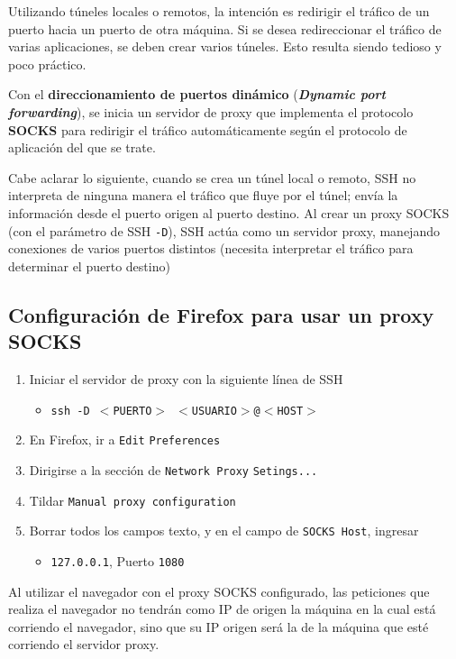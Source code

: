 Utilizando túneles locales o remotos, la intención es redirigir el tráfico de un puerto hacia un puerto de otra máquina. Si se desea redireccionar el tráfico de varias aplicaciones, se deben crear varios túneles. Esto resulta siendo tedioso y poco práctico.

Con el \textbf{direccionamiento de puertos dinámico} (\emph{\textbf{Dynamic port forwarding}}), se inicia un servidor de proxy que implementa el protocolo \textbf{SOCKS} para redirigir el tráfico automáticamente según el protocolo de aplicación del que se trate. 

Cabe aclarar lo siguiente, cuando se crea un túnel local o remoto, SSH no interpreta de ninguna manera el tráfico que fluye por el túnel; envía la información desde el puerto origen al puerto destino. Al crear un proxy SOCKS (con el parámetro de SSH \texttt{-D}), SSH actúa como un servidor proxy, manejando conexiones de varios puertos distintos (necesita interpretar el tráfico para determinar el puerto destino) \autocite{SODynamicPortForwarding}

\subsection{Configuración de Firefox para usar un proxy SOCKS}

\begin{enumerate}
    \item Iniciar el servidor de proxy con la siguiente línea de SSH
    \begin{itemize}
        \item \texttt{ssh -D $<$PUERTO$>$ $<$USUARIO$>$@$<$HOST$>$} 
    \end{itemize}
    \item En Firefox, ir a \texttt{Edit} \textrightarrow \texttt{Preferences}  
    \item Dirigirse a la sección de \texttt{Network Proxy} \textrightarrow \texttt{Setings...} 
    \item Tildar \texttt{Manual proxy configuration} 
    \item Borrar todos los campos texto, y en el campo de \texttt{SOCKS Host}, ingresar
    \begin{itemize}
        \item \texttt{127.0.0.1}, Puerto \texttt{1080}  
    \end{itemize}
\end{enumerate}

Al utilizar el navegador con el proxy SOCKS configurado, las peticiones que realiza el navegador no tendrán como IP de origen la máquina en la cual está corriendo el navegador, sino que su IP origen será la de la máquina que esté corriendo el servidor proxy.

